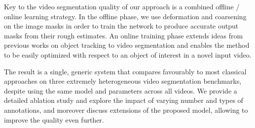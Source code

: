 \documentclass[10pt,twocolumn,letterpaper]{article}
\begin{document}
Key to the video segmentation quality of our approach is a combined offline / online learning strategy.
In the offline phase, we use deformation and coarsening on the image masks in order to train the network to produce accurate output masks from their rough estimates.
An online training phase extends ideas from previous works on object tracking \cite{Danelljan2016Eccv,Nam2016Cvpr} to video segmentation and enables the method to be easily optimized with respect to an object of interest
in a novel input video.

The result is a single, generic system that compares favourably to most classical approaches on three extremely heterogeneous video segmentation benchmarks, despite using the same model and parameters across all videos.
We provide a detailed ablation study and explore the impact of varying number and types of annotations, and moreover discuss extensions of the proposed model, allowing to improve the quality even further.






\begin{comment}

Class agnostic object tracking is a classic computer vision problem
that has been traditionally addressed via bounding boxes \cite{Kristan2015Iccvw}.
Starting from a box annotation on the first frame, one seeks to find
the object's bounding box on all remaining video frames. In the last
years, there has been a renewed interest moving from box input-output
to pixel level foreground/background segmentation on each frame \cite{Ren2007Cvpr,Li2013Iccv,Perazzi2016Cvpr}.
We will focus on this last scenario, typically named "video object
segmentation".

For this task, current top performing methods either interleave box tracking and segmentation \cite{Xiao2016Cvpr}, or propagate the first frame segment annotation in space-time via CRF-like and GrabCut-like
{} techniques \cite{Tsai2016Cvpr,Maerki2016Cvpr}.



We approach the video object segmentation problem from a new angle: we think of this problem from the perspective of object instance segmentation.
We utilize the architecture of a pixel labelling convnet and train it to generate per-frame instance segments.
We guide the network towards the instance of interest by feeding in the previous' frame mask estimate.
Our system is purely feed-forward and generates results in a single pass over the video. It leverages both online and offline training, and requires only image annotation for training (no videos).
We report competitive results on three video object segmentation  datasets, using the same model and parameters across all videos.
The proposed approach is flexible regarding the type of input supervision, thus allowing to cover diverse scenarios
including one, some, or all video frames annotated; using box or segment annotations.

\end{comment}
\end{document}
